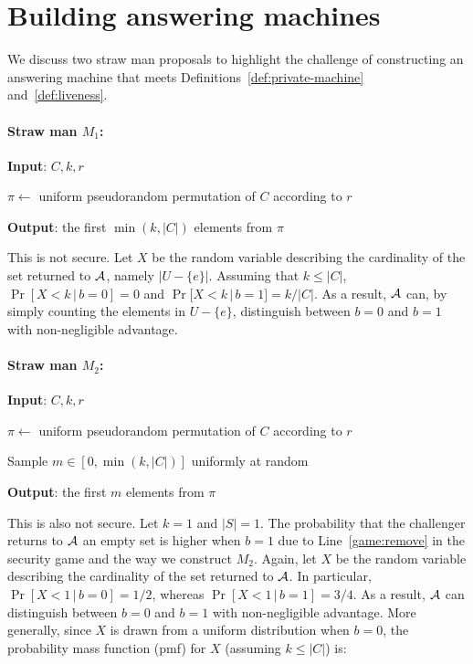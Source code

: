 \section{Building answering machines}%
\label{s:solutions}

We discuss two straw man proposals to highlight the challenge of
  constructing an answering machine that meets 
  Definitions~\ref{def:private-machine} and~\ref{def:liveness}.

\paragraph{Straw man $M_1$:} 
\begin{myitemize}
\item \textbf{Input}: $C, k, r$
\item $\pi \leftarrow$ uniform pseudorandom permutation of $C$ according to $r$
\item \textbf{Output}: the first $\min(k, |C|)$ elements from $\pi$
\end{myitemize}
This is not secure.
Let $X$ be the random variable describing the cardinality of the set returned
  to $\mathcal{A}$, namely $|U - \{e\}|$.
Assuming that $k \leq |C|$, $\Pr[ X < k \,|\, b = 0 ] = 0$ and 
  $\Pr[ X < k \,| \,b = 1 ] = k / |C|$.
As a result, $\mathcal{A}$ can, by simply counting the elements in $U - \{e\}$,
  distinguish between $b=0$ and $b=1$ with non-negligible advantage.

\paragraph{Straw man $M_2$:}
\begin{myitemize}
\item \textbf{Input}: $C, k, r$
\item $\pi \leftarrow$ uniform pseudorandom permutation of $C$ according to $r$
\item Sample $m \in [0, \min(k, |C|)]$ uniformly at random
\item \textbf{Output}: the first $m$ elements from $\pi$
\end{myitemize}

This is also not secure. Let $k = 1$ and $|S| = 1$.
The probability that the challenger returns to $\mathcal{A}$ 
  an empty set is higher when $b=1$ due to
  Line~\ref{game:remove} in the security game and the way we construct $M_2$.
Again, let $X$ be the random variable describing the cardinality of the set 
  returned to $\mathcal{A}$.
In particular, $\Pr[X < 1 \, | \, b = 0] = 1/2$, whereas 
  $\Pr[ X < 1 \, | \, b = 1] = 3/4$.
As a result, $\mathcal{A}$ can distinguish between $b=0$ and $b=1$ with non-negligible
  advantage.
More generally, since $X$ is drawn from a uniform distribution when $b=0$, 
  the probability mass function (pmf) for $X$ (assuming $k \leq |C|$) is: 

